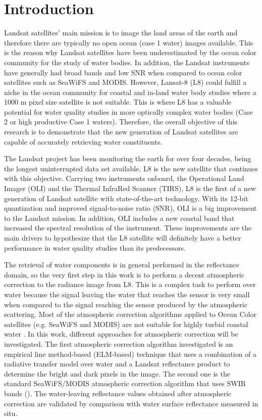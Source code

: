 \chapter{Introduction}
\label{ch:introduction} 
Landsat satellites' main mission is to image the land areas of the earth and therefore there are typically no open ocean (case 1 water) images available. This is the reason why Landsat satellites have been underestimated by the ocean color community for the study of water bodies. In addition, the Landsat instruments have generally had broad bands and low SNR when compared to ocean color satellites such as SeaWiFS and MODIS. However, Lansat-8 (L8) could fulfill a niche in the ocean community for coastal and in-land water  body studies where a 1000 m pixel size satellite is not suitable. This is where L8 has a valuable potential for water quality studies in more optically complex water bodies (Case 2 or high productive Case 1 waters). Therefore, the overall objective of this research is to demonstrate that the new generation of Landsat satellites are capable of accurately retrieving water constituents.

The Landsat project has been monitoring the earth for over four decades, being the longest uninterrupted data set available. L8 is the new satellite that continues with this objective. Carrying two instruments onboard, the Operational Land Imager (OLI) and the Thermal InfraRed Scanner (TIRS), L8 is the first of a new generation of Landsat satellite with state-of-the-art technology. With its 12-bit quantization and improved signal-to-noise ratio (SNR), OLI is a big improvement to the Landsat mission. In addition, OLI includes a new coastal band that increased the spectral resolution of the instrument. These improvements are the main drivers to hypothesize that the L8 satellite will definitely have a better performance in water quality studies than its predecessors. 

The retrieval of water components is in general performed in the reflectance domain, so the very first step in this work is to perform a {\color{red} decent} atmospheric correction to the radiance image from L8. This is a complex task to perform over water because the signal leaving the water that reaches the sensor is very small when compared to the signal reaching the sensor produced by the atmospheric scattering. Most of the atmospheric correction algorithms applied to Ocean Color satellites (e.g. SeaWiFS and MODIS) are not suitable for highly turbid coastal water \cite{Patt2003}. In this work, different approaches for atmospheric correction will be investigated. The first atmospheric correction algorithm investigated is an empirical line method-based (ELM-based) technique that uses a combination of a radiative transfer model over water and a Landsat reflectance product to determine the bright and dark pixels in the image. The second one is the standard SeaWiFS/MODIS atmospheric correction algorithm that uses SWIR bands (\cite{Wang:2007}). The water-leaving reflectance values obtained after atmospheric correction are validated by comparison with water surface reflectance measured in situ. 

